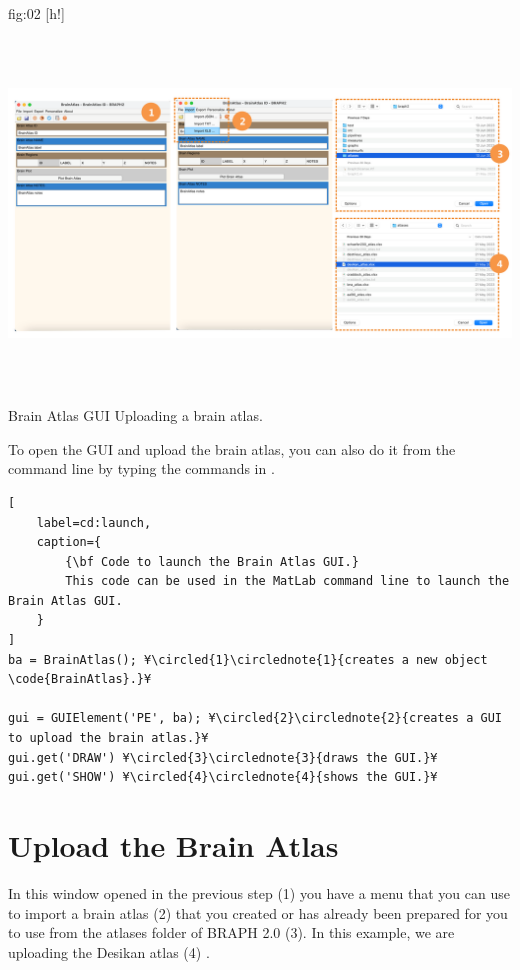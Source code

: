 \documentclass[justified]{tufte-handout}
\begin{document}
	{fig:02}
	{
	[h!]
	\includegraphics[height=10cm]{tut_ba/fig3.png}
	}
	{Brain Atlas GUI}
	{
	Uploading a brain atlas. 
	}

To open the GUI and upload the brain atlas, you can also do it from the command line by typing the commands in .
%
\begin{lstlisting}[
	label=cd:launch,
	caption={
		{\bf Code to launch the Brain Atlas GUI.}
		This code can be used in the MatLab command line to launch the  Brain Atlas GUI.
	}
]
ba = BrainAtlas(); ¥\circled{1}\circlednote{1}{creates a new object \code{BrainAtlas}.}¥

gui = GUIElement('PE', ba); ¥\circled{2}\circlednote{2}{creates a GUI to upload the brain atlas.}¥
gui.get('DRAW') ¥\circled{3}\circlednote{3}{draws the GUI.}¥
gui.get('SHOW') ¥\circled{4}\circlednote{4}{shows the GUI.}¥
\end{lstlisting}

\section{Upload the Brain Atlas}

In this window opened in the previous step (1) you have a menu that you can use to import a brain atlas (2) that you created or has already been prepared for you to use from the atlases folder of BRAPH 2.0 (3). In this example, we are uploading the Desikan atlas (4)  . 
	
\end{document}
